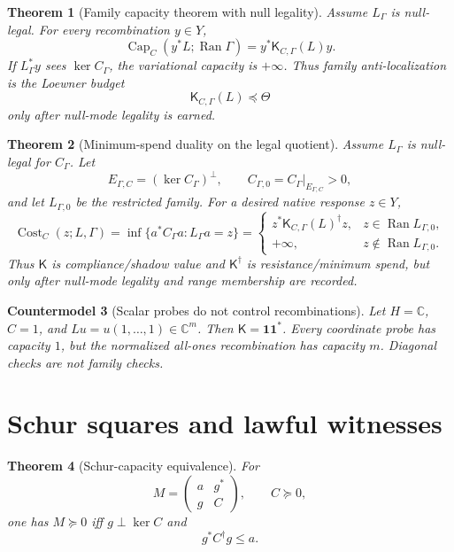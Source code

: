 \documentclass[11pt]{article}
\newtheorem{theorem}{Theorem}[section]
\newtheorem{countermodel}[theorem]{Countermodel}
\DeclareMathOperator{\range}{Ran}
\DeclareMathOperator{\Cost}{Cost}
\DeclareMathOperator{\Capacity}{Cap}
\newcommand{\K}{\mathsf K}
\newcommand{\Loewner}{\preceq}
\begin{document}
\begin{theorem}[Family capacity theorem with null legality]
Assume \(L_\Gamma\) is null-legal.  For every recombination \(y\in Y\),
\[
  \Capacity_C(y^*L;\range\Gamma)=y^*\K_{C,\Gamma}(L)y.
\]
If \(L_\Gamma^*y\) sees \(\ker C_\Gamma\), the variational capacity is \(+\infty\).  Thus family anti-localization is the Loewner budget
\[
  \K_{C,\Gamma}(L)\Loewner\Theta
\]
only after null-mode legality is earned.
\end{theorem}

\begin{theorem}[Minimum-spend duality on the legal quotient]
Assume \(L_\Gamma\) is null-legal for \(C_\Gamma\).  Let
\[
  E_{\Gamma,C}=(\ker C_\Gamma)^\perp,
  \qquad C_{\Gamma,0}=C_\Gamma|_{E_{\Gamma,C}}>0,
\]
and let \(L_{\Gamma,0}\) be the restricted family.  For a desired native response \(z\in Y\),
\[
  \Cost_C(z;L,\Gamma)=\inf\{a^*C_\Gamma a:L_\Gamma a=z\}
  =
  \begin{cases}
    z^*\K_{C,\Gamma}(L)^\dagger z, & z\in \range L_{\Gamma,0},\\
    +\infty, & z\notin \range L_{\Gamma,0}.
  \end{cases}
\]
Thus \(\K\) is compliance/shadow value and \(\K^\dagger\) is resistance/minimum spend, but only after null-mode legality and range membership are recorded.
\end{theorem}

\begin{countermodel}[Scalar probes do not control recombinations]
Let \(H=\mathbb C\), \(C=1\), and \(Lu=u(1,\ldots,1)\in\mathbb C^m\).  Then \(\K=\mathbf 1\mathbf 1^*\).  Every coordinate probe has capacity \(1\), but the normalized all-ones recombination has capacity \(m\).  Diagonal checks are not family checks.
\end{countermodel}

\section{Schur squares and lawful witnesses}

\begin{theorem}[Schur-capacity equivalence]
For
\[
  M=\begin{pmatrix}a&g^*\\ g&C\end{pmatrix},\qquad C\succeq0,
\]
one has \(M\succeq0\) iff \(g\perp\ker C\) and
\[
  g^*C^\dagger g\le a.
\]
\end{theorem}
\end{document}
